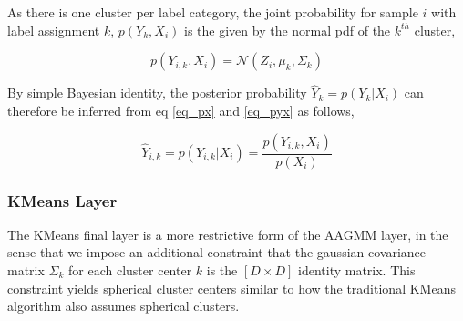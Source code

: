 \documentclass[10pt,twocolumn,letterpaper]{article}
\begin{document}
As there is one cluster per label category, the joint probability for sample $i$ with label assignment $k$, $p(Y_k,X_i)$ is the given by the normal pdf of the $k^{th}$ cluster,

\begin{equation}
	\label{eq_pyx}
	p(Y_{i,k},X_i) = \mathcal{N} (Z_i, \mu_{k}, \Sigma_k) \end{equation}

By simple Bayesian identity, the posterior probability $\hat{Y}_k=p(Y_{k}|X_i)$ can therefore be inferred from eq \ref{eq_px} and \ref{eq_pyx} as follows,

\begin{equation}
	\hat{Y}_{i,k} = p(Y_{i,k}|X_i) = \frac{p(Y_{i,k}, X_i)}{p(X_i)}
\end{equation}

%

%

\subsubsection{KMeans Layer}

The KMeans final layer is a more restrictive form of the AAGMM layer, in the sense that we impose an additional constraint that the gaussian covariance matrix $\Sigma_k$ for each cluster center $k$ is the $[D \times D]$ identity matrix. 
This constraint yields spherical cluster centers similar to how the traditional KMeans algorithm also assumes spherical clusters.
\end{document}
